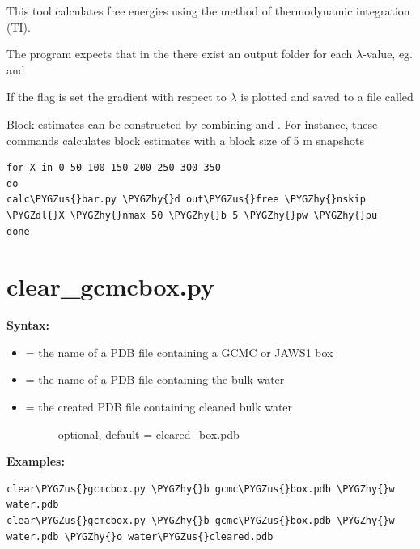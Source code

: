 \documentclass[letterpaper,10pt,english]{sphinxmanual}
\def\PYGZus{\char`\_}
\def\PYGZdl{\char`\$}
\def\PYGZhy{\char`\-}
\begin{document}
This tool calculates free energies using the method of thermodynamic integration (TI).

The program expects that in the  there exist an output folder for each \(\lambda\)-value, eg.  and 

If the  flag is set the gradient with respect to \(\lambda\) is plotted and saved to a file called 

Block estimates can be constructed by combining  and . For instance, these commands calculates block estimates with a block size of 5 m snapshots

\begin{Verbatim}[frame=single,commandchars=\\\{\}]
for X in 0 50 100 150 200 250 300 350
do
calc\PYGZus{}bar.py \PYGZhy{}d out\PYGZus{}free \PYGZhy{}nskip \PYGZdl{}X \PYGZhy{}nmax 50 \PYGZhy{}b 5 \PYGZhy{}pw \PYGZhy{}pu
done
\end{Verbatim}


\section{clear\_gcmcbox.py}
\label{tools:clear-gcmcbox-py}
\textbf{Syntax:}

\begin{itemize}
\item {} 
 = the name of a PDB file containing a GCMC or JAWS1 box

\item {} 
 = the name of a PDB file containing the bulk water

\item {} \begin{description}
\item[{ = the created PDB file containing cleaned bulk water}] \leavevmode
optional, default = cleared\_box.pdb

\end{description}

\end{itemize}

\textbf{Examples:}

\begin{Verbatim}[frame=single,commandchars=\\\{\}]
clear\PYGZus{}gcmcbox.py \PYGZhy{}b gcmc\PYGZus{}box.pdb \PYGZhy{}w water.pdb
clear\PYGZus{}gcmcbox.py \PYGZhy{}b gcmc\PYGZus{}box.pdb \PYGZhy{}w water.pdb \PYGZhy{}o water\PYGZus{}cleared.pdb
\end{Verbatim}
\end{document}

